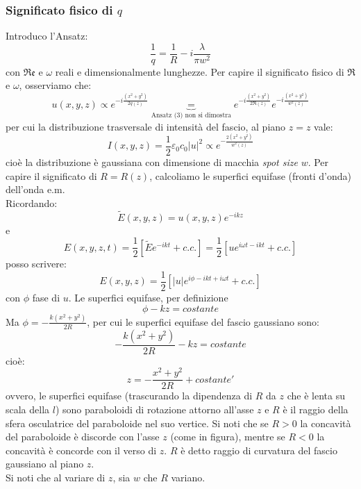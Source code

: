 \documentclass{book}
\def \w {\omega}
\def \l {\lambda}
\theoremstyle{remark}
\begin{document}
\subsubsection{Significato fisico di $q$} Introduco l'Ansatz:
\begin{equation*}
\frac{1}{q} = \frac{1}{R} - i\frac{\l}{\pi w^2}
\end{equation*}
con $\mathfrak{Re}$ e $\w$ reali e dimensionalmente lunghezze.
Per capire il significato fisico di $\Re$ e $\w$, osserviamo che:
\begin{equation*}
u(x,y,z) \propto e^{-i\frac{(x^2 + y^2)}{2q(z)}} \underbrace{=}_\text{Ansatz (3) non si dimostra} e^{-i\frac{(x^2 + y^2)}{2\Re(z)}} e^{-i\frac{(x^2 + y^2)}{w^2(z)}}
\end{equation*}
per cui la distribuzione trasversale di intensità del fascio, al piano $z = z$ vale:
\begin{equation*}
I(x,y,z) = \frac{1}{2} \varepsilon_0 c_0 |u|^2 \propto e^{-\frac{2 (x^2 + y^2)}{w^2(z)}}
\end{equation*}
cioè la distribuzione è gaussiana con dimensione di macchia \textit{spot size} $w$.
Per capire il significato di $R = R(z)$, calcoliamo le superfici equifase (fronti d'onda) dell'onda e.m.\\
Ricordando:
\begin{equation*}
\widetilde{E}(x,y,z) = u(x,y,z) e^{-ikz}
\end{equation*}
e
\begin{equation*}
E(x,y,z,t) = \frac{1}{2} \left[\widetilde{E} e^{-ikt} + c.c.\right] = \frac{1}{2} \left[u e^{i\omega t-ikt} + c.c.\right]
\end{equation*}
posso scrivere:
\begin{equation*}
E(x,y,z) = \frac{1}{2} \left[|u| e^{i\phi-ikt + i\omega t} + c.c.\right]
\end{equation*}
con $\phi$ fase di $u$. Le superfici equifase, per definizione
\begin{equation*}
\phi - kz = costante
\end{equation*}
Ma $\phi = -\frac{k (x^2 + y^2)}{2R}$, per cui le superfici equifase del fascio gaussiano sono:
\begin{equation*}
-\frac{k (x^2 + y^2)}{2R} - kz = costante
\end{equation*}
cioè:
\begin{equation*}
z = - \frac{x^2 + y^2}{2R} + costante'
\end{equation*}
ovvero, le superfici equifase (trascurando la dipendenza di $R$ da $z$ che è lenta su scala della $l$) sono paraboloidi di rotazione attorno all'asse $z$ e $R$ è il raggio della sfera osculatrice del paraboloide nel suo vertice.
Si noti che se $R > 0$ la concavità del paraboloide è discorde con l'asse $z$ (come in figura), mentre se $R < 0$ la concavità è concorde con il verso di $z$. $R$ è detto raggio di curvatura del fascio gaussiano al piano $z$.\\
Si noti che al variare di $z$, sia $w$ che $R$ variano.
\end{document}
